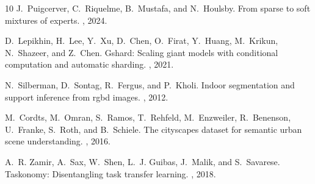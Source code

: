 \documentclass[10pt,journal,compsoc]{IEEEtran}
\begin{document}
\begin{thebibliography}{10}
J.~Puigcerver, C.~Riquelme, B.~Mustafa, and N.~Houlsby.
\newblock From sparse to soft mixtures of experts.
, 2024.

D.~Lepikhin, H.~Lee, Y.~Xu, D.~Chen, O.~Firat, Y.~Huang, M.~Krikun, N.~Shazeer, and Z.~Chen.
\newblock Gshard: Scaling giant models with conditional computation and automatic sharding.
, 2021.

N.~Silberman, D.~Sontag, R.~Fergus, and P.~Kholi.
\newblock Indoor segmentation and support inference from rgbd images.
, 2012.

M.~Cordts, M.~Omran, S.~Ramos, T.~Rehfeld, M.~Enzweiler, R.~Benenson, U.~Franke, S.~Roth, and B.~Schiele.
\newblock The cityscapes dataset for semantic urban scene understanding.
, 2016.

A.~R. Zamir, A.~Sax, W.~Shen, L.~J. Guibas, J.~Malik, and S.~Savarese.
\newblock Taskonomy: Disentangling task transfer learning.
, 2018.

\end{thebibliography}
\end{document}

